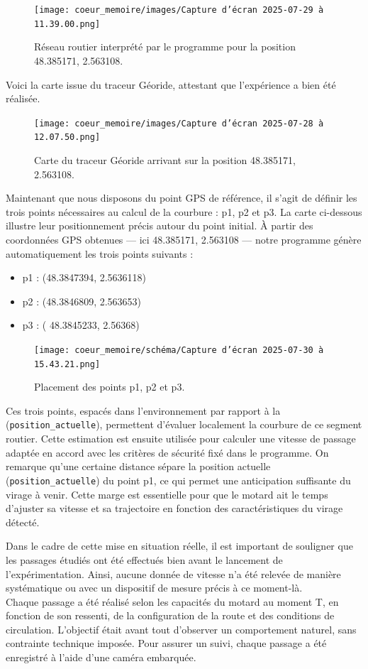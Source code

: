 \begin{figure}[H]
    \centering
    \texttt{[image: coeur\_memoire/images/Capture d’écran 2025-07-29 à 11.39.00.png]} 
    \caption{Réseau routier interprété par le programme pour la position 48.385171, 2.563108.}
\end{figure}
Voici la carte issue du traceur Géoride, attestant que l’expérience a bien été réalisée.
\begin{figure}[H]
    \centering
    \texttt{[image: coeur\_memoire/images/Capture d’écran 2025-07-28 à 12.07.50.png]} 
    \caption{Carte du traceur Géoride arrivant sur la position 48.385171, 2.563108.}
\end{figure}
Maintenant que nous disposons du point GPS de référence, il s'agit de définir les trois points nécessaires au calcul de la courbure : p1, p2 et p3. La carte ci-dessous illustre leur positionnement précis autour du point initial.
À partir des coordonnées GPS obtenues — ici 48.385171, 2.563108 — notre programme génère automatiquement les trois points suivants :
\begin{itemize}
    \item p1 : (48.3847394, 2.5636118)
    \item p2 : (48.3846809, 2.563653)
    \item p3 : ( 48.3845233, 2.56368)
\end{itemize}

\begin{figure}[H]
    \centering
    \texttt{[image: coeur\_memoire/schéma/Capture d’écran 2025-07-30 à 15.43.21.png]} 
    \caption{Placement des points p1, p2 et p3.}
    \label{fig:cartepoints}
\end{figure}
Ces trois points, espacés dans l’environnement par rapport à la (\texttt{position\_actuelle}), permettent d’évaluer localement la courbure de ce segment routier. Cette estimation est ensuite utilisée pour calculer une vitesse de passage adaptée en accord avec les critères de sécurité fixé dans le programme.
On remarque qu'une certaine distance sépare la position actuelle (\texttt{position\_actuelle}) du point p1, ce qui permet une anticipation suffisante du virage à venir. Cette marge est essentielle pour que le motard ait le temps d'ajuster sa vitesse et sa trajectoire en fonction des caractéristiques du virage détecté.

\vspace{0.5cm}
Dans le cadre de cette mise en situation réelle, il est important de souligner que les passages étudiés ont été effectués bien avant le lancement de l’expérimentation. Ainsi, aucune donnée de vitesse n’a été relevée de manière systématique ou avec un dispositif de mesure précis à ce moment-là.\\
Chaque passage a été réalisé selon les capacités du motard au moment T, en fonction de son ressenti, de la configuration de la route et des conditions de circulation. L’objectif était avant tout d’observer un comportement naturel, sans contrainte technique imposée. Pour assurer un suivi, chaque passage a été enregistré à l’aide d’une caméra embarquée.

